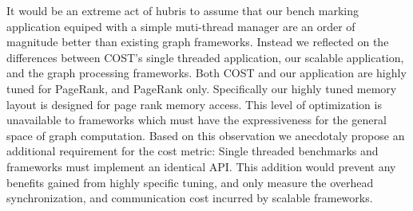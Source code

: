 It would be an extreme act of hubris to assume that our bench marking
application equiped with a simple muti-thread manager are an order of
magnitude better than existing graph frameworks. Instead we reflected on
the differences between COST's single threaded application, our
scalable application, and the graph processing frameworks. Both COST
and our application are highly tuned for PageRank, and PageRank
only. Specifically our highly tuned memory layout is designed for page
rank memory access. This level of optimization is unavailable to
frameworks which must have the expressiveness for the general space of
graph computation. Based on this observation we anecdotaly propose an
additional requirement for the cost metric: Single threaded benchmarks
and frameworks must implement an identical API. This addition would
prevent any benefits gained from highly specific tuning, and only
measure the overhead synchronization, and communication cost incurred
by scalable frameworks.



